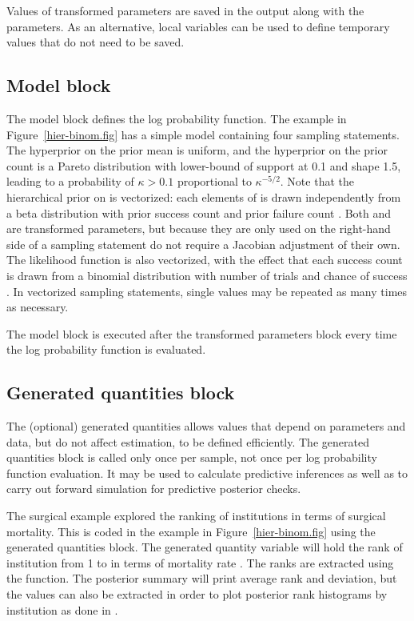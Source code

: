 \documentclass[article]{jss}
\begin{document}
Values of transformed parameters are saved in the output along
with the parameters.  As an alternative, local variables can be used
to define temporary values that do not need to be saved.  

\subsection{Model block}

The model block defines the log probability function.  The example in
Figure~\ref{hier-binom.fig} has a simple model containing four
sampling statements.  The hyperprior on the prior mean 
is uniform, and the hyperprior on the prior count  is a
Pareto distribution with lower-bound of support at 0.1 and shape 1.5,
leading to a probability of $\kappa > 0.1$ proportional to
$\kappa^{-5/2}$.  Note that the hierarchical prior on  is
vectorized: each elements of  is drawn independently from
a beta distribution with prior success count  and prior
failure count .  Both  and  are
transformed parameters, but because they are only used on the
right-hand side of a sampling statement do not require a Jacobian
adjustment of their own.  The likelihood function is also vectorized,
with the effect that each success count  is drawn from a
binomial distribution with number of trials  and chance of
success .  In vectorized sampling statements, single
values may be repeated as many times as necessary.  

The model block is executed after the transformed parameters block
every time the log probability function is evaluated.  

\subsection{Generated quantities block}

The (optional) generated quantities allows values that depend on
parameters and data, but do not affect estimation, to be defined
efficiently.  The generated quantities block is called only once per
sample, not once per log probability function evaluation.  It may be
used to calculate predictive inferences as well as to carry out
forward simulation for predictive posterior checks.

The  surgical example explored the ranking of
institutions in terms of surgical mortality.  This is coded in the
example in Figure~\ref{hier-binom.fig} using the generated quantities
block.  The generated quantity variable  will hold the
rank of institution  from 1 to  in terms of mortality
rate .  The ranks are extracted using the 
function. The posterior summary will print average rank and deviation,
but the values can also be extracted in order to plot posterior rank
histograms by institution as done in \citep[Examples, Volume
1]{LunnEtAl:2000}.
\end{document}
